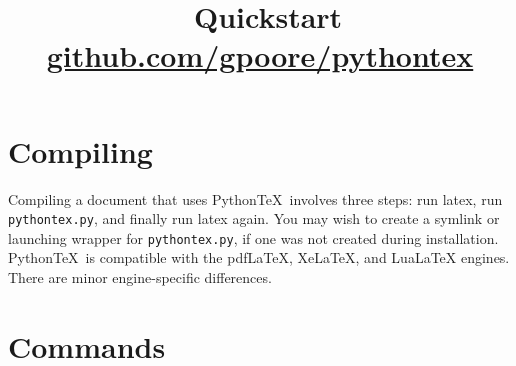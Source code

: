 \documentclass[twocolumn]{article}
\title{\vspace{-0.6in} \pytex\ Quickstart \\ {\normalsize \href{https://github.com/gpoore/pythontex}{github.com/gpoore/pythontex}}}
\author{}
\date{}
\newcommand{\pytex}{Python\TeX}
\begin{document}
\maketitle




\section*{Compiling}

Compiling a document that uses \pytex\ involves three steps:  run latex, run \texttt{pythontex.py}, and finally run latex again.  You may wish to create a symlink or launching wrapper for \texttt{pythontex.py}, if one was not created during installation.  \pytex\ is compatible with the pdfLaTeX, XeLaTeX, and LuaLaTeX engines.  There are minor engine-specific differences.


\section*{Commands}
\end{document}
